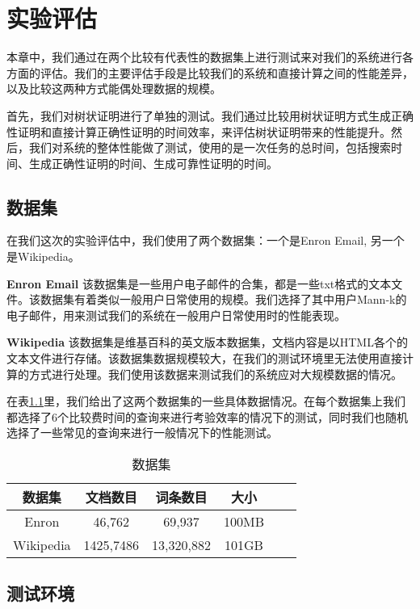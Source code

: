 \chapter{实验评估}
\label{chap:evaluation}
本章中，我们通过在两个比较有代表性的数据集上进行测试来对我们的系统进行各方面的评估。我们的主要评估手段是比较我们的系统和直接计算之间的性能差异，以及比较这两种方式能偶处理数据的规模。

首先，我们对树状证明进行了单独的测试。我们通过比较用树状证明方式生成正确性证明和直接计算正确性证明的时间效率，来评估树状证明带来的性能提升。然后，我们对系统的整体性能做了测试，使用的是一次任务的总时间，包括搜索时间、生成正确性证明的时间、生成可靠性证明的时间。

\section{数据集}

在我们这次的实验评估中，我们使用了两个数据集：一个是Enron Email, 另一个是Wikipedia。

\textbf{Enron Email} 该数据集是一些用户电子邮件的合集，都是一些txt格式的文本文件。该数据集有着类似一般用户日常使用的规模。我们选择了其中用户Mann-k的电子邮件，用来测试我们的系统在一般用户日常使用时的性能表现。

\textbf{Wikipedia} 该数据集是维基百科的英文版本数据集，文档内容是以HTML各个的文本文件进行存储。该数据集数据规模较大，在我们的测试环境里无法使用直接计算的方式进行处理。我们使用该数据来测试我们的系统应对大规模数据的情况。

在表\ref{tab:dataset_stat}里，我们给出了这两个数据集的一些具体数据情况。在每个数据集上我们都选择了6个比较费时间的查询来进行考验效率的情况下的测试，同时我们也随机选择了一些常见的查询来进行一般情况下的性能测试。
\begin{table}[htb]
    \centering
    \caption{数据集}
    \begin{tabular}{cccccc}
        \toprule
        数据集 & 文档数目 & 词条数目 & 大小 \\
        \midrule
        Enron & 46,762 & 69,937 & 100MB  \\
        Wikipedia & 1425,7486 & 13,320,882 & 101GB  \\
        \bottomrule
    \end{tabular}
    \label{tab:dataset_stat}
\end{table}

\section {测试环境}

